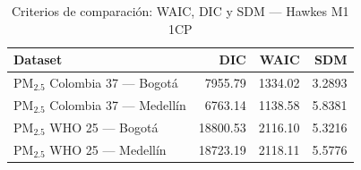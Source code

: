 \begin{table}[htbp]
\centering
\caption{Criterios de comparaci\'{o}n: WAIC, DIC y SDM --- Hawkes M1 1CP}
\label{tab:hawkes_criterios_1cp}
\begin{tabular}{lrrr}
\toprule
Dataset & DIC & WAIC & SDM \\
\midrule
PM$_{2.5}$ Colombia 37 --- Bogot\'{a} & 7955.79 & 1334.02 & 3.2893 \\
PM$_{2.5}$ Colombia 37 --- Medell\'{i}n & 6763.14 & 1138.58 & 5.8381 \\
PM$_{2.5}$ WHO 25 --- Bogot\'{a} & 18800.53 & 2116.10 & 5.3216 \\
PM$_{2.5}$ WHO 25 --- Medell\'{i}n & 18723.19 & 2118.11 & 5.5776 \\
\bottomrule
\end{tabular}
\end{table}
